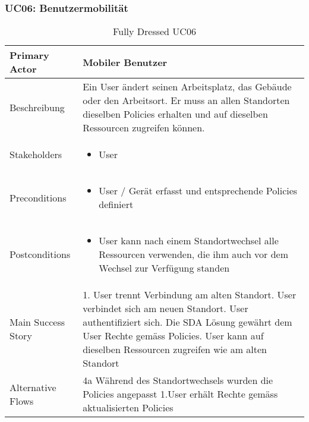 \subsubsection{UC06: Benutzermobilität}
\begin{table}[H]
	\centering
	\begin{tabularx}{\textwidth}{l | X}
		Primary Actor   & Mobiler Benutzer        \\
		\hline
		Beschreibung   & Ein User ändert seinen Arbeitsplatz, das Gebäude oder den Arbeitsort. Er muss an allen Standorten dieselben Policies erhalten und auf dieselben Ressourcen zugreifen können.  \\ 
		\hline
		Stakeholders       & 
		\begin{itemize}
			\item User
		\end{itemize} \\ 
		Preconditions      &
		\begin{itemize}	
			\item User / Gerät erfasst und entsprechende Policies definiert
		\end{itemize}  \\
		\hline
		Postconditions     & 
		\begin{itemize}	
			\item User kann nach einem Standortwechsel alle Ressourcen verwenden, die ihm auch vor dem Wechsel zur Verfügung standen
		\end{itemize}  \\
		\hline
		Main Success Story & 
		1.  User trennt Verbindung am alten Standort\newline
		2.  User verbindet sich am neuen Standort\newline
		3.  User authentifiziert sich\newline
		4.  Die SDA Lösung gewährt dem User Rechte gemäss Policies\newline
		5.  User kann auf dieselben Ressourcen zugreifen wie am alten Standort\newline
		\\
		\hline
		Alternative Flows  & 
		4a Während des Standortwechsels wurden die Policies angepasst \newline
		\noindent\hspace*{6mm} 1.User erhält Rechte gemäss aktualisierten Policies \newline
	\end{tabularx}
	\caption{Fully Dressed UC06}
	\label{tab:UC06}
\end{table}
